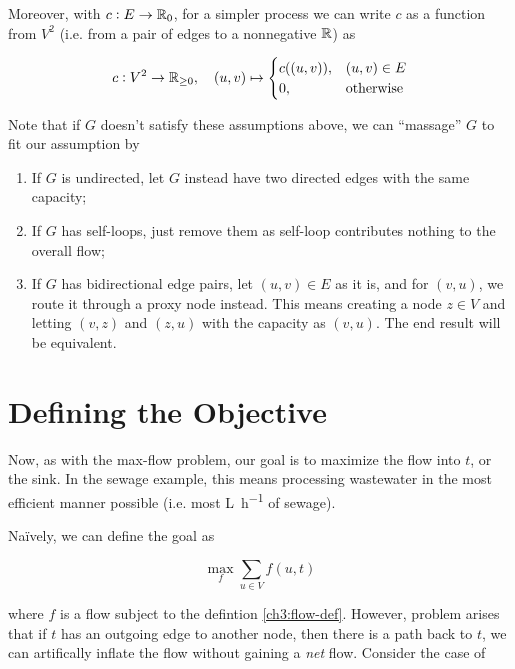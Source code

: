 Moreover, with $c:E\to\mathbb{{R}}_0$, for a simpler process we can write $c$ as a function from $V^2$ (i.e. from a pair of edges to a nonnegative $\mathbb{{R}}$) as

\begin{equation}
    c: V^2 \to \mathbb{{R}}_{\ge 0}, \quad (u,v) \mapsto \begin{cases}
        c((u,v)), & (u,v)\in E \\
        0,& \text{otherwise}
    \end{cases}
\end{equation}

Note that if $G$ doesn't satisfy these assumptions above, we can ``massage'' $G$ to fit our assumption by

\begin{enumerate}
    \item If $G$ is undirected, let $G$ instead have two directed edges with the same capacity; 
    \item If $G$ has self-loops, just remove them as self-loop contributes nothing to the overall flow;
    \item If $G$ has bidirectional edge pairs, let $(u,v)\in E$ as it is, and for $(v,u)$, we route it through a proxy node instead.
    This means creating a node $z \in V$ and letting $(v,z)$ and $(z,u)$ with the capacity as $(v,u)$.
    The end result will be equivalent. 
\end{enumerate}

\section{Defining the Objective}

Now, as with the max-flow problem, our goal is to maximize the flow into $t$, or the sink.
In the sewage example, this means processing wastewater in the most efficient manner possible (i.e. most \si{\liter\per\hour} of sewage).

Na\"ively, we can define the goal as 

\begin{equation}
    \label{ch3:naive-obj}
    \max_{f} \sum_{u\in V} f(u,t)
\end{equation}

where $f$ is a flow subject to the defintion \ref{ch3:flow-def}. 
However, problem arises that if $t$ has an outgoing edge to another node, then there is a path back to $t$, we can artifically inflate the flow without gaining a \textit{net} flow. 
Consider the case of


